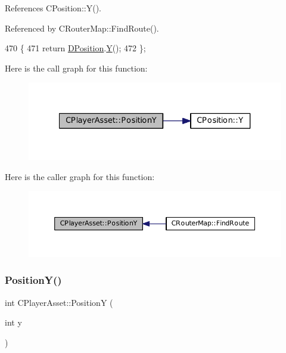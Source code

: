 References C\+Position\+::\+Y().



Referenced by C\+Router\+Map\+::\+Find\+Route().


\begin{DoxyCode}
470                              \{
471             \textcolor{keywordflow}{return} \hyperlink{classCPlayerAsset_aa9f53c009b181c7c5647c6b03776a04c}{DPosition}.\hyperlink{classCPosition_a1aa8a30e2f08dda1f797736ba8c13a87}{Y}();  
472         \};
\end{DoxyCode}
Here is the call graph for this function\+:\nopagebreak
\begin{figure}[H]
\begin{center}
\leavevmode
\includegraphics[width=327pt]{classCPlayerAsset_a4f70846298e9951489ef138847c268a5_cgraph}
\end{center}
\end{figure}
Here is the caller graph for this function\+:\nopagebreak
\begin{figure}[H]
\begin{center}
\leavevmode
\includegraphics[width=350pt]{classCPlayerAsset_a4f70846298e9951489ef138847c268a5_icgraph}
\end{center}
\end{figure}
\hypertarget{classCPlayerAsset_a497fe719ca97252f0ee7985e0e30518e}{}\label{classCPlayerAsset_a497fe719ca97252f0ee7985e0e30518e} 
\subsubsection{\texorpdfstring{Position\+Y()}{PositionY()}\hspace{0.1cm}{\footnotesize\ttfamily [2/2]}}
{\footnotesize\ttfamily int C\+Player\+Asset\+::\+PositionY (\begin{DoxyParamCaption}\item[{int}]{y }\end{DoxyParamCaption})}



